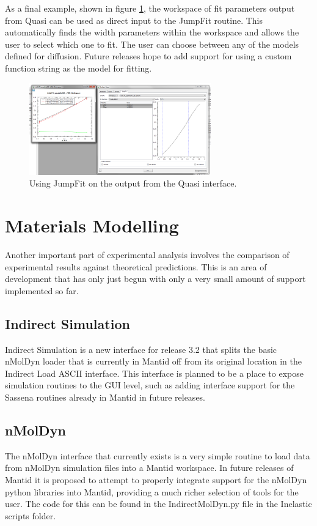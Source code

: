 \documentclass[paper=a4, fontsize=11pt]{scrartcl}	%
\numberwithin{equation}{section}															%
\numberwithin{figure}{section}																%
\numberwithin{table}{section}																%
\begin{document}
As a final example, shown in figure \ref{fig:iris-bayes-jumpfit}, the workspace of fit parameters output from Quasi can be used as direct input to the JumpFit routine. This automatically finds the width parameters within the workspace and allows the user to select which one to fit. The user can choose between any of the models defined for diffusion. Future releases hope to add support for using a custom function string as the model for fitting.

\begin{figure}[H]
\centering
\includegraphics[width=0.7\textwidth]{img/iris-bayes-jumpfit.png}
\caption{Using JumpFit on the output from the Quasi interface.}
\label{fig:iris-bayes-jumpfit}
\end{figure}

\clearpage
\section{Materials Modelling}
\label{sec:simulation}
Another important part of experimental analysis involves the comparison of experimental results against theoretical predictions. This is an area of development that has only just begun with only a very small amount of support implemented so far.

\subsection{Indirect Simulation}
Indirect Simulation is a new interface for release 3.2 that splits the basic nMolDyn loader that is currently in Mantid off from its original location in the Indirect Load ASCII interface. This interface is planned to be a place to expose simulation routines to the GUI level, such as adding interface support for the Sassena routines already in Mantid in future releases.

\subsection{nMolDyn}
The nMolDyn interface that currently exists is a very simple routine to load data from nMolDyn simulation files into a Mantid workspace. In future releases of Mantid it is proposed to attempt to properly integrate support for the nMolDyn python libraries into Mantid, providing a much richer selection of tools for the user. The code for this can be found in the IndirectMolDyn.py file in the Inelastic scripts folder.
\end{document}
